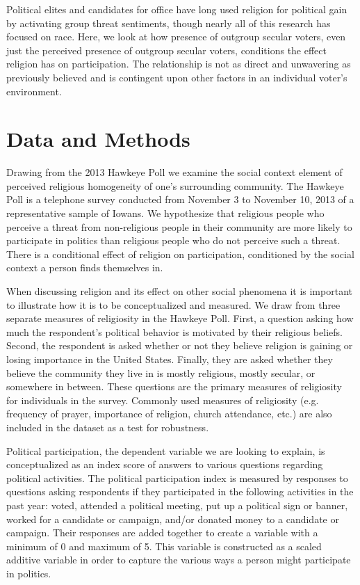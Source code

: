 \documentclass{article}
\begin{document}
Political elites and candidates for office have long used religion for political gain by activating group threat sentiments, though nearly all of this research has focused on race.  Here, we look at how presence of outgroup secular voters, even just the perceived presence of outgroup secular voters, conditions the effect religion has on participation.  The relationship is not as direct and unwavering as previously believed and is contingent upon other factors in an individual voter's environment.  

\section*{Data and Methods}
Drawing from the 2013 Hawkeye Poll we examine the social context element of perceived religious homogeneity of one's surrounding community.  The Hawkeye Poll is a telephone survey conducted from November 3 to November 10, 2013 of a representative sample of Iowans.  We hypothesize that religious people who perceive a threat from non-religious people in their community are more likely to participate in politics than religious people who do not perceive such a threat.  There is a conditional effect of religion on participation, conditioned by the social context a person finds themselves in.  

When discussing religion and its effect on other social phenomena it is important to illustrate how it is to be conceptualized and measured.  We draw from three separate measures of religiosity in the Hawkeye Poll.  First, a question asking how much the respondent's political behavior is motivated by their religious beliefs.  Second, the respondent is asked whether or not they believe religion is gaining or losing importance in the United States.  Finally, they are asked whether they believe the community they live in is mostly religious, mostly secular, or somewhere in between.  These questions are the primary measures of religiosity for individuals in the survey.  Commonly used measures of religiosity (e.g. frequency of prayer, importance of religion, church attendance, etc.) are also included in the dataset as a test for robustness.

Political participation, the dependent variable we are looking to explain, is conceptualized as an index score of answers to various questions regarding political activities.  The political participation index is measured by responses to questions asking respondents if they participated in the following activities in the past year: voted, attended a political meeting, put up a political sign or banner, worked for a candidate or campaign, and/or donated money to a candidate or campaign.  Their responses are added together to create a variable with a minimum of 0 and maximum of 5.  This variable is constructed as a scaled additive variable in order to capture the various ways a person might participate in politics. 
\end{document}
